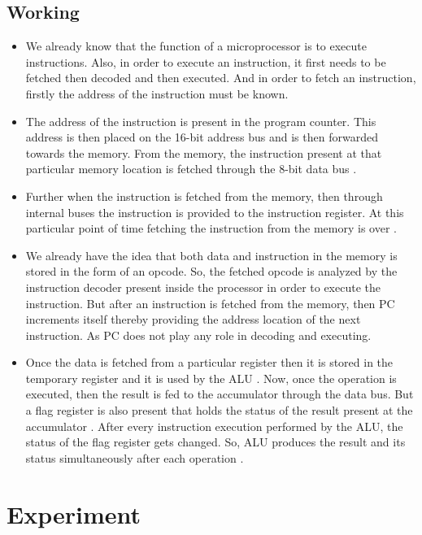 \documentclass[14pt]{article}
\begin{document}
\subsection{Working}
\vspace{1em}
\begin{itemize}
	\item{We already know that the function of a microprocessor is to execute instructions. Also, in order to execute an instruction, it first needs to be fetched then decoded and then executed. And in order to fetch an instruction, firstly the address of the instruction must be known.}
	\item{The address of the instruction is present in the program counter. This address is then placed on the 16-bit address bus and is then forwarded towards the memory. From the memory, the instruction present at that particular memory location is fetched through the 8-bit data bus .}
	\item{Further when the instruction is fetched from the memory, then through internal buses the instruction is provided to the instruction register. At this particular point of time fetching the instruction from the memory is over .}
	\item{We already have the idea that both data and instruction in the memory is stored in the form of an opcode. So, the fetched opcode is analyzed by the instruction decoder present inside the processor in order to execute the instruction. But after an instruction is fetched from the memory, then PC increments itself thereby providing the address location of the next instruction. As PC does not play any role in decoding and executing. }
	\item{Once the data is fetched from a particular register then it is stored in the temporary register and it is used by the ALU . Now, once the operation is executed, then the result is fed to the accumulator through the data bus. But a flag register is also present that holds the status of the result present at the accumulator . After every instruction execution performed by the ALU, the status of the flag register gets changed. So, ALU produces the result and its status simultaneously after each operation . }
\end{itemize}



\section{Experiment}
\end{document}
